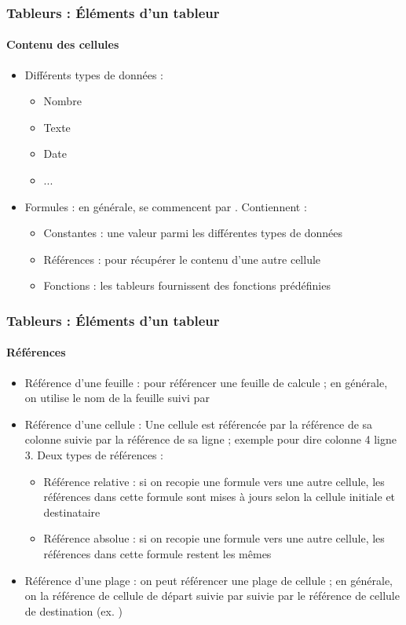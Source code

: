 \documentclass[xcolor=table, usenames,dvipsnames]{beamer}
\begin{document}
\begin{frame}
\frametitle{Tableurs : Éléments d'un tableur}
\framesubtitle{Contenu des cellules}

\begin{itemize}
	\item Différents types de données : 
	\begin{itemize}
		\item Nombre
		\item Texte
		\item Date 
		\item ...
	\end{itemize}

	\item Formules : en générale, se commencent par \keyword{=}. Contiennent :
	\begin{itemize}
		\item Constantes : une valeur parmi les différentes types de données
		\item Références : pour récupérer le contenu d'une autre cellule
		\item Fonctions : les tableurs fournissent des fonctions prédéfinies 
	\end{itemize}
	
\end{itemize}


\end{frame}

\begin{frame}
\frametitle{Tableurs : Éléments d'un tableur}
\framesubtitle{Références}

\begin{itemize}
	\item Référence d'une feuille : pour référencer une feuille de calcule ; en générale, on utilise le nom de la feuille suivi par \keyword{!}
	\item Référence d'une cellule : Une cellule est référencée par la référence de sa colonne suivie par la référence de sa ligne ; exemple  pour dire colonne 4 ligne 3. Deux types de références : 
	\begin{itemize}
		\item Référence relative : si on recopie une formule vers une autre cellule, les références dans cette formule sont mises à jours selon la cellule initiale et destinataire
		\item Référence absolue : si on recopie une formule vers une autre cellule, les références dans cette formule restent les mêmes
	\end{itemize}
	\item Référence d'une plage : on peut référencer une plage de cellule ; en générale, on la référence de cellule de départ suivie par \keyword{:} suivie par le référence de cellule de destination (ex. )
\end{itemize}
\end{frame}
\end{document}
